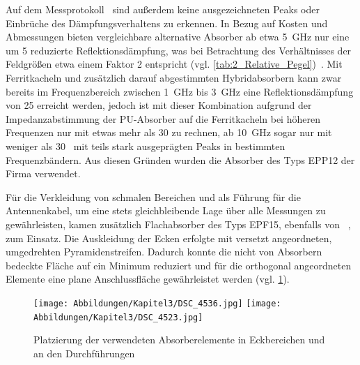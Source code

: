 Auf dem Messprotokoll~\cite{Eco_Messtechnik_Absorber} sind außerdem keine ausgezeichneten Peaks oder Einbrüche des Dämpfungsverhaltens zu erkennen. In Bezug auf Kosten und Abmessungen bieten vergleichbare alternative Absorber ab etwa \SI{5}{\giga\hertz} nur eine um \SI{5}{\Dezibel} reduzierte Reflektionsdämpfung, was bei Betrachtung des Verhältnisses der Feldgrößen etwa einem Faktor 2 entspricht (vgl. \Tabelle\ref{tab:2_Relative_Pegel})~\cite{Holland_Shielding_Absorber}. Mit Ferritkacheln und zusätzlich darauf abgestimmten Hybridabsorbern kann zwar bereits im Frequenzbereich zwischen \SI{1}{\giga\hertz} bis \SI{3}{\giga\hertz} eine Reflektionsdämpfung von \SI{25}{\Dezibel} erreicht werden, jedoch ist mit dieser Kombination aufgrund der Impedanzabstimmung der PU-Absorber auf die Ferritkacheln bei höheren Frequenzen nur mit etwas mehr als \SI{30}{\Dezibel} zu rechnen, ab \SI{10}{\giga\hertz} sogar nur mit weniger als \SI{30}{\Dezibel}~\cite{Holland_Shielding_Absorber} mit teils stark ausgeprägten Peaks in bestimmten Frequenzbändern. Aus diesen Gründen wurden die Absorber des Typs EPP12 der Firma  verwendet. 
\par
\vspace{\linespace}
Für die Verkleidung von schmalen Bereichen und als Führung für die Antennenkabel, um eine stets gleichbleibende Lage über alle Messungen zu gewährleisten, kamen zusätzlich Flachabsorber des Typs EPF15, ebenfalls von ~\cite{Eco_Messtechnik_Absorber}, zum Einsatz. Die Auskleidung der Ecken erfolgte mit versetzt angeordneten, umgedrehten Pyramidenstreifen. Dadurch konnte die nicht von Absorbern bedeckte Fläche auf ein Minimum reduziert und für die orthogonal angeordneten Elemente eine plane Anschlussfläche gewährleistet werden (vgl. \Abb\ref{fig:3_Absorberplatzierung}).
\par
\vspace{\linespace}

\begin{figure}[ht]
    \centering
    \texttt{[image: Abbildungen/Kapitel3/DSC\_4536.jpg]}
    \hspace{1cm}
    \texttt{[image: Abbildungen/Kapitel3/DSC\_4523.jpg]}
    \caption[Platzierung der verwendeten Absorber in Eckbereichen und an Durchführungen]{Platzierung der verwendeten Absorberelemente in Eckbereichen und an den Durchführungen}
    \label{fig:3_Absorberplatzierung}
\end{figure}


